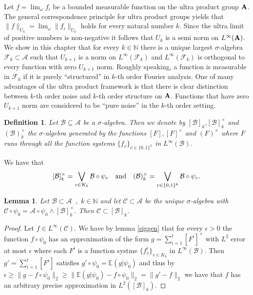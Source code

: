 \documentclass [11pt] {article}
\newtheorem{lemma}{Lemma}[section]
\newtheorem{definition}{Definition}[section]
\def\bA{{\bf A}}
\begin{document}
Let $f=\lim_\omega f_i$ be a bounded measurable function on the ultra product group $\bA$. 
The general correspondence principle for ultra product groups yields that $\|f\|_{U_k}=\lim_\omega\|f_i\|_{U_k}$ holds for every natural number $k$.
Since the ultra limit of positive numbers is non-negative it follows that $U_k$ is a semi norm on $L^\infty(\bA)$. 
We show in this chapter that for every $k\in\mathbb{N}$ there is a unique largest $\sigma$-algebra $\mathcal{F}_k\subset\mathcal{A}$ such that $U_{k+1}$ is a norm on $L^\infty(\mathcal{F}_k)$ and $L^\infty(\mathcal{F}_k)$ is orthogonal to every function with zero $U_{k+1}$ norm. Roughly speaking, a function is measurable in $\mathcal{F}_k$ if it is purely ``structured'' in $k$-th order Fourier analysis. 
One of many advantages of the ultra product framework is that there is clear distinction between $k$-th order noise and $k$-th order structure on $\bA$. Functions that have zero $U_{k+1}$ norm are considered to be ``pure noise'' in the $k$-th order setting.

\begin{definition} Let $\mathcal{B}\subseteq\mathcal{A}$ be a $\sigma$-algebra. Then we denote by $[\mathcal{B}]_k$,$[\mathcal{B}]_k^\times$ and $(\mathcal{B})_k^\times$ the $\sigma$-algebra generated by the functions $[F],[F]^\times$ and $(F)^\times$ where $F$  runs through all the function systems $\{f_v\}_{v\in\{0,1\}^k}$ in $L^\infty(\mathcal{B})$. 
\end{definition}

We have that $$[\mathcal{B}]^\times_k=\bigvee_{v\in K_k}\mathcal{B}\circ\psi_v~~~{\rm and}~~~(\mathcal{B})^\times_k=\bigvee_{v\in\{0,1\}^k}\mathcal{B}\circ\psi_v.$$

\begin{lemma}\label{convcontlift} Let $\mathcal{B}\subset\mathcal{A}$~,~$k\in\mathbb{N}$ and let $\mathcal{C}\subset\mathcal{A}$ be the unique $\sigma$-algebra with $\mathcal{C}\circ\psi_0=\mathcal{A}\circ\psi_0\wedge[\mathcal{B}]_k^\times$. Then $\mathcal{C}\subset[\mathcal{B}]_k$.
\end{lemma}

\begin{proof} Let $f\in L^\infty(\mathcal{C})$. We have by lemma \ref{siggen} that for every $\epsilon>0$ the function $f\circ\psi_0$ has an epproximation of the form $g=\sum_{i=1}^t[F^i]^\times$ with $L^2$ error at most $\epsilon$ where each $F^i$ is a function systme $\{f^i_v\}_{v\in K_k}$ in $L^\infty(\mathcal{B})$.  Then $g'=\sum_{i=1}^t[F^i]$ satisfies $g'\circ\psi_0=\mathbb{E}(g|\psi_0)$ and thus by $\epsilon\geq\|g-f\circ\psi_0\|_2\geq\|\mathbb{E}(g|\psi_0)-f\circ\psi_0\|_2=\|g'-f\|_2$ we have that $f$ has an arbitrary precise approximation in $L^2([\mathcal{B}]_k)$.
\end{proof}
 
\end{document}
